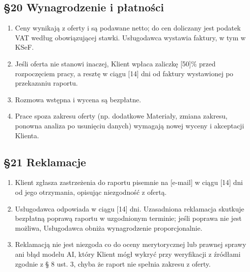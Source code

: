 \documentclass[11pt,a4paper]{article}
\begin{document}
\subsection*{§20 Wynagrodzenie i płatności}
\begin{enumerate}
\item Ceny wynikają z oferty i są podawane netto; do cen doliczany jest podatek VAT według obowiązującej stawki. Usługodawca wystawia faktury, w tym w KSeF.
\item Jeśli oferta nie stanowi inaczej, Klient wpłaca zaliczkę [50]\% przed rozpoczęciem pracy, a resztę w ciągu [14] dni od faktury wystawionej po przekazaniu raportu.
\item Rozmowa wstępna i wycena są bezpłatne.
\item Prace spoza zakresu oferty (np. dodatkowe Materiały, zmiana zakresu, ponowna analiza po usunięciu danych) wymagają nowej wyceny i akceptacji Klienta.
\end{enumerate}

\subsection*{§21 Reklamacje}
\begin{enumerate}
\item Klient zgłasza zastrzeżenia do raportu pisemnie na [e-mail] w ciągu [14] dni od jego otrzymania, opisując niezgodność z ofertą.
\item Usługodawca odpowiada w ciągu [14] dni. Uzasadniona reklamacja skutkuje bezpłatną poprawą raportu w uzgodnionym terminie; jeśli poprawa nie jest możliwa, Usługodawca obniża wynagrodzenie proporcjonalnie.
\item Reklamacją nie jest niezgoda co do oceny merytorycznej lub prawnej sprawy ani błąd modelu AI, który Klient mógł wykryć przy weryfikacji z źródłami zgodnie z § 8 ust. 3, chyba że raport nie spełnia zakresu z oferty.
\end{enumerate}
\end{document}
